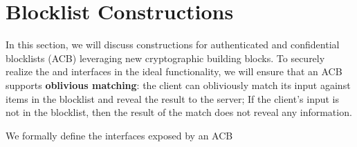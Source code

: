 \newcommand{\authBlocklistFunc}{\ensuremath{\mathcal{F}_{\mathsf{AuthBlk}}}\xspace}
\newcommand{\blindedBlocklist}{\ensuremath{\blocklist^{(\mathsf{blind})}}\xspace}
\NewDocumentCommand{\oprfBlindingFactor}{o}{\ensuremath{r_{#1}}\xspace}
\newcommand{\preprocess}{\ensuremath{\mathsf{Preprocess}}\xspace}
\newcommand{\searchBlocklist}{\ensuremath{\mathsf{Search}}\xspace}
\newcommand{\thresholdSearchBlocklist}{\ensuremath{\mathsf{TSearch}}\xspace}
\newcommand{\blocklistBlindingAlg}{\ensuremath{f^{\mathsf{blind}}}\xspace}
\newcommand{\blocklistBlindingKeySpace}{\ensuremath{\mathcal{K}_{blind}}\xspace}
\newcommand{\blocklistBlindingKey}{\ensuremath{k_{blind}}\xspace} 
\newcommand{\publishList}{\ensuremath{\mathsf{Publish}}\xspace}

\newcommand{\preprocessFn}{\ensuremath{f^{pre}}\xspace}
\newcommand{\preprocessOutputSpace}{\ensuremath{\mathcal{V}}\xspace}
\newcommand{\clientSecretKey}{\ensuremath{sk_{client}}\xspace}
\newcommand{\clientSecretKeySpace}{\ensuremath{\mathcal{K}_{client}}\xspace}
\newcommand{\serverSecretKey}{\ensuremath{sk_{server}}\xspace}
\newcommand{\serverSecretKeySpace}{\ensuremath{\mathcal{K}_{server}}\xspace}

\newcommand{\genericCInputSet}{\ensuremath{Y}\xspace}

\section{Blocklist Constructions}
%
In this section, we will discuss constructions for authenticated and confidential blocklists (ACB) leveraging new cryptographic building blocks. To securely realize the \checkContent and \checkContentFuzzy interfaces in the ideal functionality, we will ensure that an ACB supports \textbf{oblivious matching}: the client can obliviously match its input against items in the blocklist and reveal the result to the server; If the client's input is not in the blocklist, then the result of the match does not reveal any information.

We formally define the interfaces exposed by an ACB

